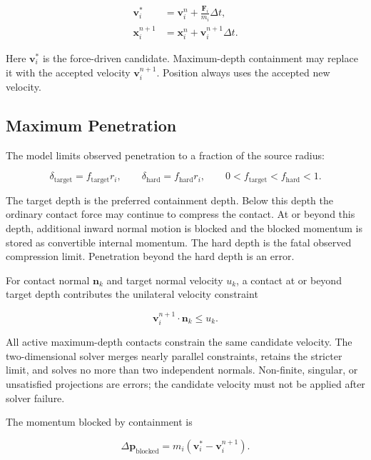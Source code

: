\begin{align}
\mathbf v_i^* &= \mathbf v_i^n+
    \frac{\mathbf F_i}{m_i}\Delta t,\\
\mathbf x_i^{n+1} &= \mathbf x_i^n+
    \mathbf v_i^{n+1}\Delta t.
\end{align}

Here \(\mathbf v_i^*\) is the force-driven candidate.  Maximum-depth
containment may replace it with the accepted velocity
\(\mathbf v_i^{n+1}\).  Position always uses the accepted new velocity.

\subsection{Maximum Penetration}

The model limits observed penetration to a fraction of the source radius:

\begin{equation}
\delta_{\mathrm{target}}=f_{\mathrm{target}}r_i,
\qquad
\delta_{\mathrm{hard}}=f_{\mathrm{hard}}r_i,
\qquad
0<f_{\mathrm{target}}<f_{\mathrm{hard}}<1.
\end{equation}

The target depth is the preferred containment depth.  Below this depth the
ordinary contact force may continue to compress the contact.  At or beyond
this depth, additional inward normal motion is blocked and the blocked
momentum is stored as convertible internal momentum.  The hard depth is the
fatal observed compression limit.  Penetration beyond the hard depth is an
error.

For contact normal \(\mathbf n_k\) and target normal velocity \(u_k\), a
contact at or beyond target depth contributes the unilateral velocity
constraint

\begin{equation}
\mathbf v_i^{n+1}\cdot\mathbf n_k\leq u_k.
\end{equation}

All active maximum-depth contacts constrain the same candidate velocity.
The two-dimensional solver merges nearly parallel constraints, retains the
stricter limit, and solves no more than two independent normals.  Non-finite,
singular, or unsatisfied projections are errors; the candidate velocity must
not be applied after solver failure.

The momentum blocked by containment is

\begin{equation}
\Delta\mathbf p_{\mathrm{blocked}}
=m_i\left(\mathbf v_i^*-\mathbf v_i^{n+1}\right).
\end{equation}

